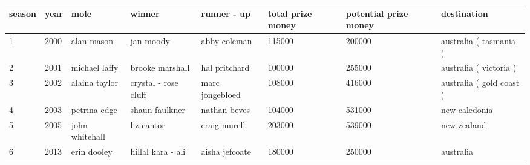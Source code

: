 \documentclass{article}
\begin{document}
\begin{tabular}{llllllll}
\toprule
season & year & mole & winner & runner - up & total prize money & potential prize money & destination \\
\midrule
1 & 2000 & alan mason & jan moody & abby coleman & 115000 & 200000 & australia ( tasmania ) \\
2 & 2001 & michael laffy & brooke marshall & hal pritchard & 100000 & 255000 & australia ( victoria ) \\
3 & 2002 & alaina taylor & crystal - rose cluff & marc jongebloed & 108000 & 416000 & australia ( gold coast ) \\
4 & 2003 & petrina edge & shaun faulkner & nathan beves & 104000 & 531000 & new caledonia \\
5 & 2005 & john whitehall & liz cantor & craig murell & 203000 & 539000 & new zealand \\
6 & 2013 & erin dooley & hillal kara - ali & aisha jefcoate & 180000 & 250000 & australia \\
\bottomrule
\end{tabular}
\end{document}
